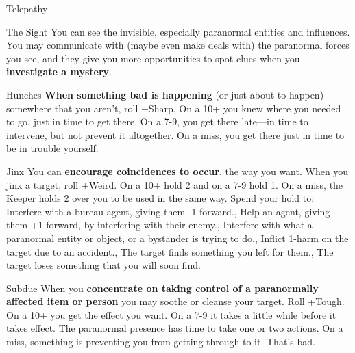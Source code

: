 {\begin{move}{Telepathy}
\end{move}
%
}{%
%
\begin{move}{The Sight}
You can see the invisible, especially paranormal entities and influences. You may communicate with (maybe even make deals with) the paranormal forces you see, and they give you more opportunities to spot clues when you \textbf{investigate a mystery}.
\end{move}%
\br[1mm]
%
\begin{move}{Hunches}
\textbf{When something bad is happening} (or just about to happen) somewhere that you aren’t, roll +Sharp. On a 10+ you knew where you needed to go, just in time to get there. On a 7-9, you get there late—in time to intervene, but not prevent it altogether. On a miss, you get there just in time to be in trouble yourself.
\end{move}%
\br[1mm]
%
\begin{move}{Jinx}
You can \textbf{encourage coincidences to occur}, the way you want. When you jinx a target, roll +Weird. On a 10+ hold 2 and on a 7-9 hold 1. On a miss, the Keeper holds 2 over you to be used in the same way. Spend your hold to:
\holdoptions%
    {{Interfere with a bureau agent, giving them -1 forward.},
    {Help an agent, giving them +1 forward, by interfering with their enemy.},
    {Interfere with what a paranormal entity or object, or a bystander is trying to do.},
    {Inflict 1-harm on the target due to an accident.},
    {The target finds something you left for them.},
    {The target loses something that you will soon find.}}
\end{move}%
\br[2mm]
%
\begin{move}{Subdue}
When you \textbf{concentrate on taking control of a paranormally affected item or person} you may soothe or cleanse your target. Roll +Tough.  On a 10+ you get the effect you want.  On a 7-9 it takes a little while before it takes effect.  The paranormal presence has time to take one or two actions.  On a miss, something is preventing you from getting through to it.  That’s bad. 
\end{move}
%
}\pagebreak%
%
